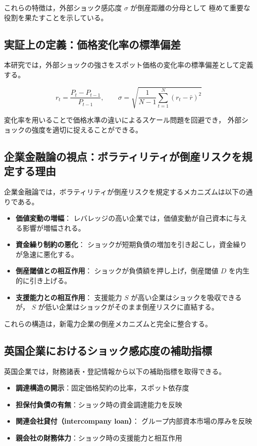これらの特徴は，外部ショック感応度 $\sigma$ が倒産距離の分母として
極めて重要な役割を果たすことを示している。

\subsection{実証上の定義：価格変化率の標準偏差}

本研究では，外部ショックの強さをスポット価格の変化率の標準偏差として定義する。



\[
r_t = \frac{P_t - P_{t-1}}{P_{t-1}}, \qquad
\sigma = \sqrt{\frac{1}{N-1}\sum_{t=1}^{N}(r_t - \bar{r})^2}
\]



変化率を用いることで価格水準の違いによるスケール問題を回避でき，
外部ショックの強度を適切に捉えることができる。

\subsection{企業金融論の視点：ボラティリティが倒産リスクを規定する理由}

企業金融論では，ボラティリティが倒産リスクを規定するメカニズムは以下の通りである。

\begin{itemize}
    \item \textbf{価値変動の増幅}：
          レバレッジの高い企業では，価値変動が自己資本に与える影響が増幅される。
    \item \textbf{資金繰り制約の悪化}：
          ショックが短期負債の増加を引き起こし，資金繰りが急速に悪化する。
    \item \textbf{倒産閾値との相互作用}：
          ショックが負債額を押し上げ，倒産閾値 $D$ を内生的に引き上げる。
    \item \textbf{支援能力との相互作用}：
          支援能力 $S$ が高い企業はショックを吸収できるが，
          $S$ が低い企業はショックがそのまま倒産リスクに直結する。
\end{itemize}

これらの構造は，新電力企業の倒産メカニズムと完全に整合する。

\subsection{英国企業におけるショック感応度の補助指標}

英国企業では，財務諸表・登記情報から以下の補助指標を取得できる。

\begin{itemize}
    \item \textbf{調達構造の開示}：固定価格契約の比率，スポット依存度
    \item \textbf{担保付負債の有無}：ショック時の資金調達能力を反映
    \item \textbf{関連会社貸付（intercompany loan）}：
          グループ内部資本市場の厚みを反映
    \item \textbf{親会社の財務体力}：ショック時の支援能力と相互作用
\end{itemize}

